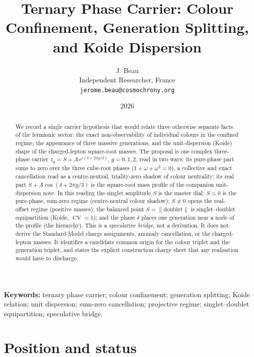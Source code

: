 \documentclass[11pt]{article}
\title{Ternary Phase Carrier: Colour Confinement, Generation Splitting,\\ and Koide Dispersion}
\author{J. Beau\\
Independent Researcher, France\\
\texttt{jerome.beau@cosmochrony.org}}
\date{2026}
\theoremstyle{definition}
\theoremstyle{remark}
\newcommand{\CV}{\operatorname{CV}}
\begin{document}
  \maketitle

  \begin{abstract}
    We record a single carrier hypothesis that would relate three otherwise separate facts of the fermionic
    sector: the exact non-observability of individual colours in the confined regime, the appearance of three
    massive generations, and the unit-dispersion (Koide) shape of the charged-lepton square-root masses.
    The proposal is one complex three-phase carrier $z_g = S + A\,e^{i(\delta + 2\pi g/3)}$, $g = 0,1,2$, read in
    two ways: its pure-phase part sums to zero over the three cube-root phases ($1 + \omega + \omega^2 = 0$), a
    collective and exact cancellation read as a centre-neutral, triality-zero shadow of colour neutrality; its
    real part $S + A\cos(\delta + 2\pi g/3)$ is the square-root mass profile of the companion
    unit-dispersion note.
    In this reading the singlet amplitude $S$ is the master dial: $S = 0$ is the pure-phase, sum-zero regime
    (centre-neutral colour shadow); $S \neq 0$ opens the real-offset regime (positive masses); the balanced point $S =
    \lVert\text{doublet}\rVert$ is singlet--doublet equipartition (Koide, $\CV = 1$); and the phase $\delta$ places
    one generation near a node of the profile (the hierarchy).
    This is a \emph{speculative bridge}, not a derivation.
    It does not derive the Standard-Model charge assignments, anomaly cancellation, or the charged-lepton masses.
    It identifies a candidate common origin for the colour triplet and the generation triplet, and states the
    explicit construction charge sheet that any realisation would have to discharge.
  \end{abstract}

  \noindent\textbf{Keywords:}
  ternary phase carrier; colour confinement; generation splitting; Koide relation; unit dispersion; sum-zero
  cancellation; projective regime; singlet--doublet equipartition; speculative bridge.

  \newpage

  \tableofcontents

  \newpage

  \section{Position and status}
    \label{sec:position}
\end{document}
